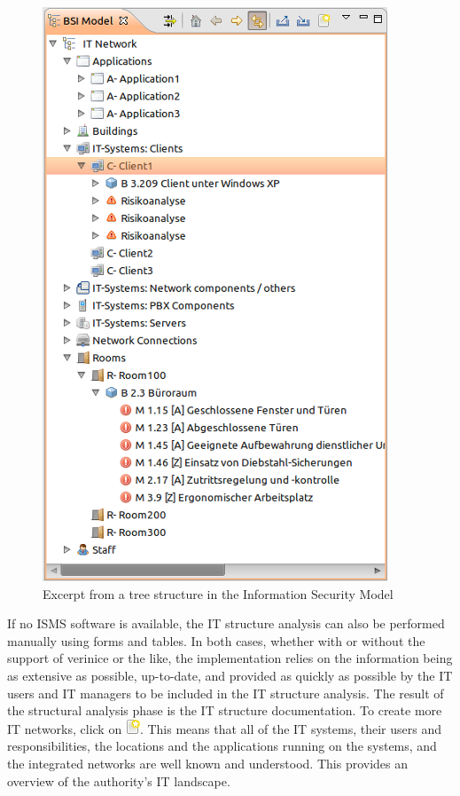 \documentclass[a4paper,10pt]{book}
\begin{document}
\begin{figure}[htb!]
  \centering
  \includegraphics[scale=.65]{Screenshot/GS_Modell_Baumstruktur-en.png}
  \caption{\label{Excerpt from a tree structure in the Information Security Model} Excerpt from a tree structure in the Information Security Model}
\end{figure}
If no ISMS software is available, the IT structure analysis can also be performed manually using forms and tables. In both cases, whether with or without the support of verinice or the like, the implementation relies on the information being as extensive as possible, up-to-date, and provided as quickly as possible by the IT users and IT managers to be included in the IT structure analysis.
\newline
The result of the structural analysis phase is the IT structure documentation. \newline
To create more IT networks, click on  \includegraphics[height=2ex]{Icon/Oeffnen.png}.
This means that all of the IT systems, their users and responsibilities, the locations and the applications running on the systems, and the integrated networks are well known and understood. This provides an overview of the authority's IT landscape.
\end{document}
